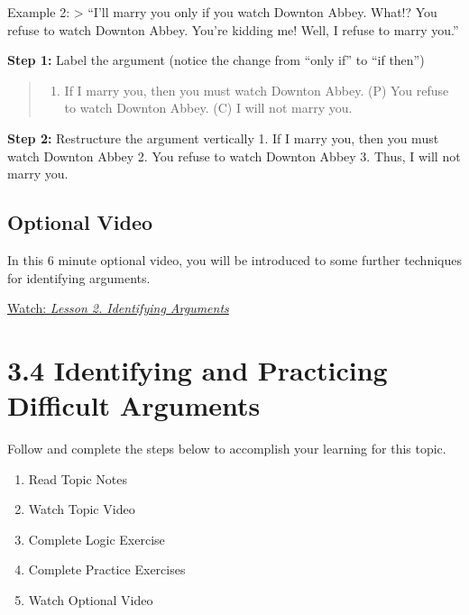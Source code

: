 \documentclass[
]{book}
\providecommand{\tightlist}{%
  \setlength{\itemsep}{0pt}\setlength{\parskip}{0pt}}
\begin{document}
\begin{reflect}
Example 2:
\textgreater{} ``I'll marry you only if you watch Downton Abbey. What!? You refuse to watch Downton Abbey. You're kidding me! Well, I refuse to marry you.''

\textbf{Step 1:} Label the argument (notice the change from ``only if'' to ``if then'')

\begin{quote}
\begin{enumerate}
\def\labelenumi{(\Alph{enumi})}
\setcounter{enumi}{15}
\tightlist
\item
  If I marry you, then you must watch Downton Abbey. (P) You refuse to watch Downton Abbey. (C) I will not marry you.
\end{enumerate}
\end{quote}

\textbf{Step 2:} Restructure the argument vertically
1. If I marry you, then you must watch Downton Abbey
2. You refuse to watch Downton Abbey
3. Thus, I will not marry you.
\end{reflect}

\hypertarget{optional-video-10}{%
\subsection*{Optional Video}\label{optional-video-10}}

\begin{reflect}
In this 6 minute optional video, you will be introduced to some further techniques for identifying arguments.

\href{https://www.youtube.com/watch?v=lYiEj5z8le8}{Watch: \emph{Lesson 2. Identifying Arguments}}
\end{reflect}

\hypertarget{identifying-and-practicing-difficult-arguments}{%
\section*{3.4 Identifying and Practicing Difficult Arguments}\label{identifying-and-practicing-difficult-arguments}}

Follow and complete the steps below to accomplish your learning for this topic.

\begin{enumerate}
\def\labelenumi{\arabic{enumi}.}
\tightlist
\item
  Read Topic Notes
\item
  Watch Topic Video
\item
  Complete Logic Exercise
\item
  Complete Practice Exercises
\item
  Watch Optional Video
\end{enumerate}
\end{document}
